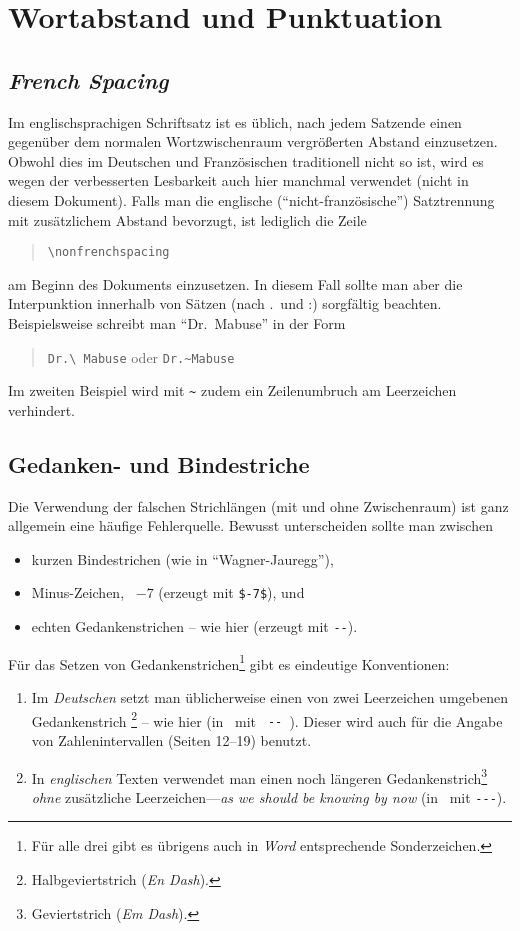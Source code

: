 \section{Wortabstand und Punktuation}

\subsection{\emph{French Spacing}}
Im englischsprachigen Schriftsatz ist es üblich, nach jedem
Satzende einen gegenüber dem normalen Wortzwischenraum
vergrößerten Abstand einzusetzen. Obwohl dies im Deutschen und
Französischen traditionell nicht so ist, wird es wegen der
verbesserten Lesbarkeit auch hier manchmal verwendet (nicht in diesem
Dokument). Falls man die englische ("`nicht-französische"') Satztrennung mit
zusätzlichem Abstand bevorzugt, ist lediglich die Zeile
%
\begin{quote}
\verb!\nonfrenchspacing!
\end{quote}
%
am Beginn des Dokuments einzusetzen. 
In diesem Fall sollte man 
aber die Interpunktion innerhalb von
Sätzen (nach .\ und :) sorgfältig beachten. Beispielsweise
schreibt man "`Dr.\ Mabuse"' in der Form
%
\begin{quote}
\verb!Dr.\ Mabuse! oder \verb!Dr.~Mabuse!
\end{quote}
%
Im zweiten Beispiel wird mit \verb!~! zudem ein Zeilenumbruch am Leerzeichen verhindert.


\subsection{Gedanken- und Bindestriche}
\label{sec:gedankenstrich}

Die Verwendung der falschen Strichlängen (mit und ohne
Zwischenraum) ist ganz allgemein eine häufige Fehlerquelle.
Bewusst unterscheiden sollte man zwischen
%
\begin{itemize}
\item kurzen Bindestrichen (wie in "`Wagner-Jauregg"'), %
\item Minus-Zeichen, \zB\ $-7$ (erzeugt mit \verb!$-7$!), und %
\item echten Gedankenstrichen -- wie hier (erzeugt mit \verb!--!).
\end{itemize}
%
\noindent Für das Setzen von Gedankenstrichen\footnote{Für alle
drei gibt es übrigens auch in \emph{Word} entsprechende
Sonderzeichen.} gibt es eindeutige Konventionen:
%
\begin{enumerate}
\item Im \emph{Deutschen} setzt man üblicherweise einen von zwei
Leerzeichen umgebenen Gedankenstrich%
\footnote{Halbgeviertstrich (\emph{En Dash}).} -- wie hier (in
\latex\ mit {\verb*! -- !}). Dieser wird auch für die Angabe von
Zahlenintervallen (Seiten 12--19) benutzt. 
%
\item In \emph{englischen} Texten verwendet man einen noch längeren
Gedankenstrich\footnote{Geviertstrich (\emph{Em Dash}).} \emph{ohne}
zusätzliche Leerzeichen---\emph{as we should be knowing by now}
(in \latex\ mit {\verb*!---!}).
%
\end{enumerate}




